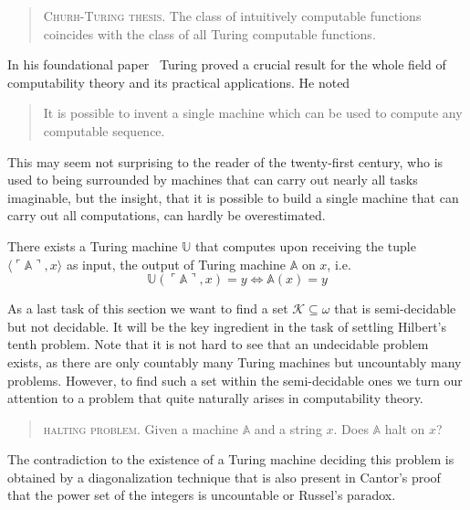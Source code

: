 \begin{quote}
  \textsc{Churh-Turing thesis.} The class of intuitively computable
  functions coincides with the class of all Turing computable functions.
\end{quote}

In his foundational paper~\cite{Turing1936} Turing proved a crucial result for
the whole field of computability theory and its practical applications. He noted
\begin{quote}
  It is possible to invent a single machine which can be used to compute any
  computable sequence.
\end{quote}
This may seem not surprising to the reader of the twenty-first century, who is
used to being surrounded by machines that can carry out nearly all tasks
imaginable, but the insight, that it is possible to build a single machine that
can carry out all computations, can hardly be overestimated.

\begin{thm}
    There exists a Turing machine $\mathbb U$ that computes upon receiving
    the tuple $⟨\ulcorner \mathbb A \urcorner, x⟩$ as input, the output of
    Turing machine $\mathbb A$ on $x$, i.e.
    \[
      \mathbb U(\ulcorner \mathbb A \urcorner, x) = y \Leftrightarrow
        \mathbb A (x) = y
    \]
\end{thm}

As a last task of this section we want to find a set \(\mathcal{K} \subseteq ω\)
that is semi-decidable but not decidable. It will be the key ingredient in the
task of settling Hilbert's tenth problem. Note that it is not hard to see that
an undecidable problem exists, as there are only countably many Turing machines
but uncountably many problems. However, to find such a set within the
semi-decidable ones we turn our attention to a problem that quite naturally
arises in computability theory.
\begin{quote}
  \textsc{halting problem.} Given a machine $\mathbb A$ and a string $x$. Does
  $\mathbb A$ halt on $x$?
\end{quote}
The contradiction to the existence of a Turing machine deciding this problem is
obtained by a diagonalization technique that is also present in Cantor's proof
that the power set of the integers is uncountable or Russel's paradox.

